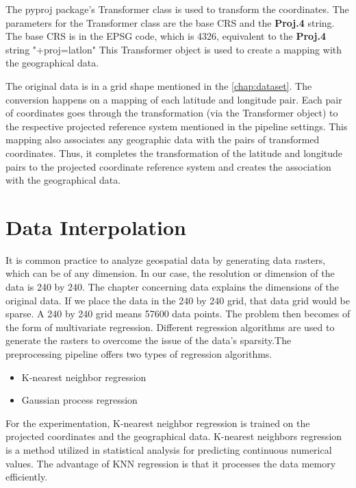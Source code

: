 The pyproj package's Transformer class is used to transform the coordinates.
The parameters for the Transformer class are the base CRS and the \textbf{Proj.4} string. The base CRS is in the EPSG code, which is 4326, equivalent to the \textbf{Proj.4} string "+proj=latlon" This Transformer object is used to create a mapping with the geographical data.

The original data is in a grid shape mentioned in the \autoref{chap:dataset}. The conversion happens on a mapping of each latitude and longitude pair. Each pair of coordinates goes through the transformation (via the Transformer object) to the respective projected reference system mentioned in the pipeline settings.
This mapping also associates any geographic data with the pairs of transformed coordinates.
Thus, it completes the transformation of the latitude and longitude pairs to the projected coordinate reference system and creates the association with the geographical data.



\section{Data Interpolation }
It is common practice to analyze geospatial data by generating data rasters, which can be of any dimension. In our case, the resolution or dimension of the data is 240 by 240. The chapter concerning data explains the dimensions of the original data. If we place the data in the 240 by 240 grid, that data grid would be sparse. A 240 by 240 grid means 57600 data points. The problem then becomes of the form of multivariate regression. Different regression algorithms are used to generate the rasters to overcome the issue of the data's sparsity.The preprocessing pipeline offers two types of regression algorithms.

\begin{itemize}
    \item K-nearest neighbor regression
    \item Gaussian process regression
\end{itemize}
For the experimentation, K-nearest neighbor regression is trained on the projected coordinates and the geographical data. K-nearest neighbors regression is a method utilized in statistical analysis for predicting continuous numerical values. The advantage of KNN regression is that it processes the data memory efficiently.

